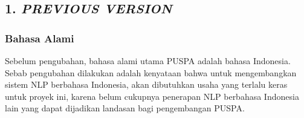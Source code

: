 \subsection*{\textcolor{subsectioncolor}{\textsf{1. \textit{PREVIOUS VERSION}}}}

\subsubsection*{Bahasa Alami}
Sebelum pengubahan, bahasa alami utama PUSPA adalah bahasa Indonesia.
Sebab pengubahan dilakukan adalah kenyataan bahwa untuk mengembangkan sistem NLP berbahasa Indonesia,
akan dibutuhkan usaha yang terlalu keras untuk proyek ini,
karena belum cukupnya penerapan NLP berbahasa Indonesia lain yang dapat dijadikan landasan bagi pengembangan PUSPA.
